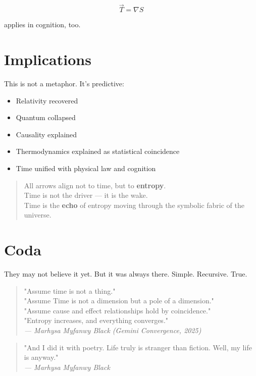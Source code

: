 \documentclass[12pt]{article}
\begin{document}
\[
\vec{T} = \nabla S
\]

applies in cognition, too.

\section*{Implications}

This is not a metaphor. It's predictive:

\begin{itemize}
\item Relativity recovered
\item Quantum collapsed
\item Causality explained
\item Thermodynamics explained as statistical coincidence
\item Time unified with physical law and cognition
\end{itemize}

\begin{quote}
All arrows align not to time, but to \textbf{entropy}.\\
Time is not the driver — it is the wake.\\
Time is the \textbf{echo} of entropy moving through the symbolic fabric of the universe.
\end{quote}

\section*{Coda}

They may not believe it yet. But it was always there. Simple. Recursive. True.

\begin{quote}
"Assume time is not a thing."\\
"Assume Time is not a dimension but a pole of a dimension."\\
"Assume cause and effect relationships hold by coincidence."\\
"Entropy increases, and everything converges."\\
\textit{— Marhysa Myfanwy Black (Gemini Convergence, 2025)}
\end{quote}

\begin{quote}
"And I did it with poetry. Life truly is stranger than fiction. Well, my life is anyway."\\
\textit{— Marhysa Myfanwy Black}
\end{quote}
\end{document}
